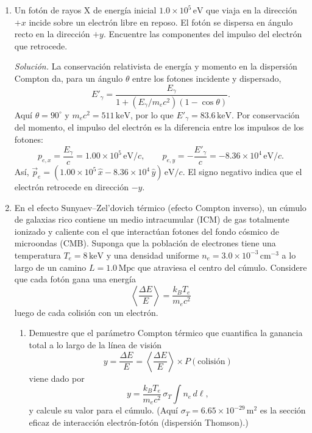 \documentclass[11pt]{article}
\begin{document}
\begin{enumerate}
    \item Un fotón de rayos X de energía inicial $1.0 \times 10^5\,\mathrm{eV}$ que viaja en la dirección $+x$ incide sobre un electrón libre en reposo. El fotón se dispersa en ángulo recto en la dirección $+y$. Encuentre las componentes del impulso del electrón que retrocede.

    \textit{Solución.} La conservación relativista de energía y momento en la dispersión Compton da, para un ángulo $\theta$ entre los fotones incidente y dispersado,
    \[
        E'_\gamma=\frac{E_\gamma}{1+(E_\gamma/m_ec^2)(1-\cos\theta)}.
    \]
    Aquí $\theta=90^\circ$ y $m_ec^2=511\,\mathrm{keV}$, por lo que $E'_\gamma=83.6\,\mathrm{keV}$. Por conservación del momento, el impulso del electrón es la diferencia entre los impulsos de los fotones:
    \[
        p_{e,x}=\frac{E_\gamma}{c}=1.00\times10^5\,\mathrm{eV}/c,
        \qquad
        p_{e,y}=-\frac{E'_\gamma}{c}=-8.36\times10^4\,\mathrm{eV}/c.
    \]
    Así, $\vec p_e=(1.00\times10^5\,\hat{x}-8.36\times10^4\,\hat{y})\,\mathrm{eV}/c$. El signo negativo indica que el electrón retrocede en dirección $-y$. \parencite[Secs. 16.2--16.2.1, pp. 525--528]{chaparro2026}
    

    \item En el efecto Sunyaev--Zel'dovich térmico (efecto Compton inverso), un cúmulo de galaxias rico contiene un medio intracumular (ICM) de gas totalmente ionizado y caliente con el que interactúan fotones del fondo cósmico de microondas (CMB). Suponga que la población de electrones tiene una temperatura $T_e = 8\,\mathrm{keV}$ y una densidad uniforme $n_e = 3.0 \times 10^{-3}\,\mathrm{cm}^{-3}$ a lo largo de un camino $L = 1.0\,\mathrm{Mpc}$ que atraviesa el centro del cúmulo. Considere que cada fotón gana una energía
    \[
        \left\langle \frac{\Delta E}{E} \right\rangle = \frac{k_B T_e}{m_e c^2}
    \]
    luego de cada colisión con un electrón.
    \begin{enumerate}
        \item[(a)] Demuestre que el parámetro Compton térmico que cuantifica la ganancia total a lo largo de la línea de visión
        \[
            y = \frac{\Delta E}{E} = \left\langle \frac{\Delta E}{E} \right\rangle \times P(\text{colisión})
        \]
        viene dado por
        \[
            y = \frac{k_B T_e}{m_e c^2}\,\sigma_T \int n_e\,d\ell,
        \]
        y calcule su valor para el cúmulo. (Aquí $\sigma_T = 6.65 \times 10^{-29}\,\mathrm{m}^2$ es la sección eficaz de interacción electrón-fotón (dispersión Thomson).)


\end{enumerate}
\end{enumerate}
\end{document}
